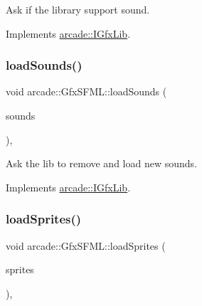 Ask if the library support sound. 



Implements \hyperlink{classarcade_1_1_i_gfx_lib_a68cfbc987dfecca5b1405e36e00157b2}{arcade\+::\+I\+Gfx\+Lib}.

\mbox{\label{classarcade_1_1_gfx_s_f_m_l_aaec16dc42e480cdb6b6cbc3f75e4951c}} 
\subsubsection{\texorpdfstring{load\+Sounds()}{loadSounds()}}
{\footnotesize\ttfamily void arcade\+::\+Gfx\+S\+F\+M\+L\+::load\+Sounds (\begin{DoxyParamCaption}\item[{std\+::vector$<$ std\+::pair$<$ std\+::string, \hyperlink{namespacearcade_a3bb4743a2eea59f3927e404e6549cae5}{Sound\+Type} $>$ $>$ const \&}]{sounds }\end{DoxyParamCaption})\hspace{0.3cm}{\ttfamily [override]}, {\ttfamily [virtual]}}



Ask the lib to remove and load new sounds. 



Implements \hyperlink{classarcade_1_1_i_gfx_lib_a725faf0722d284d15eb389b0a1891a27}{arcade\+::\+I\+Gfx\+Lib}.

\mbox{\label{classarcade_1_1_gfx_s_f_m_l_a1e586ce151c47e3b5a6abcfdf5ecdc79}} 
\subsubsection{\texorpdfstring{load\+Sprites()}{loadSprites()}}
{\footnotesize\ttfamily void arcade\+::\+Gfx\+S\+F\+M\+L\+::load\+Sprites (\begin{DoxyParamCaption}\item[{std\+::vector$<$ std\+::unique\+\_\+ptr$<$ \hyperlink{classarcade_1_1_i_sprite}{I\+Sprite} $>$$>$ \&\&}]{sprites }\end{DoxyParamCaption})\hspace{0.3cm}{\ttfamily [override]}, {\ttfamily [virtual]}}



